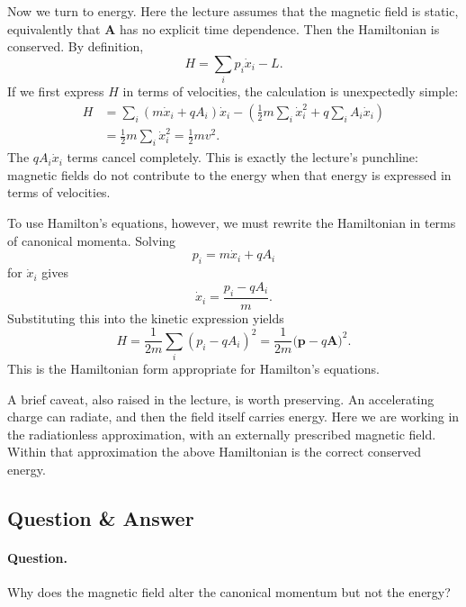 Now we turn to energy. Here the lecture assumes that the magnetic field is static, equivalently that \(\mathbf A\) has no explicit time dependence. Then the Hamiltonian is conserved. By definition,
\begin{equation}
H=\sum_i p_i\dot x_i-L.
\end{equation}
If we first express \(H\) in terms of velocities, the calculation is unexpectedly simple:
\begin{align}
H
&=
\sum_i (m\dot x_i+qA_i)\dot x_i
-
\left(\frac12 m\sum_i \dot x_i^2+q\sum_i A_i\dot x_i\right) \\
&=
\frac12 m\sum_i \dot x_i^2
=
\frac12 mv^2.
\end{align}
The \(qA_i\dot x_i\) terms cancel completely. This is exactly the lecture's punchline: magnetic fields do not contribute to the energy when that energy is expressed in terms of velocities.

To use Hamilton's equations, however, we must rewrite the Hamiltonian in terms of canonical momenta. Solving
\[
p_i=m\dot x_i+qA_i
\]
for \(\dot x_i\) gives
\begin{equation}
\dot x_i=\frac{p_i-qA_i}{m}.
\end{equation}
Substituting this into the kinetic expression yields
\begin{equation}
H=\frac{1}{2m}\sum_i (p_i-qA_i)^2
=
\frac{1}{2m}\bigl(\mathbf p-q\mathbf A\bigr)^2.
\end{equation}
This is the Hamiltonian form appropriate for Hamilton's equations.

A brief caveat, also raised in the lecture, is worth preserving. An accelerating charge can radiate, and then the field itself carries energy. Here we are working in the radiationless approximation, with an externally prescribed magnetic field. Within that approximation the above Hamiltonian is the correct conserved energy.

\subsection{Question \& Answer}

\paragraph{Question.} Why does the magnetic field alter the canonical momentum but not the energy?

